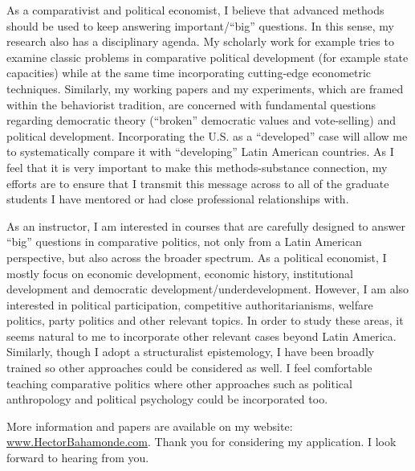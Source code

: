 \documentclass[10pt,stdletter,dateno,sigleft]{newlfm} %
\begin{document}
\begin{newlfm}
As a comparativist and political economist, I believe that advanced methods should be used to keep answering important/``big'' questions. In this sense, my research also has a disciplinary agenda. My scholarly work for example tries to examine classic problems in comparative political development (for example state capacities) while at the same time incorporating cutting-edge econometric techniques. Similarly, my working papers and my experiments, which are framed within the behaviorist tradition, are concerned with fundamental questions regarding democratic theory (``broken'' democratic values and vote-selling) and political development. Incorporating the U.S. as a ``developed'' case will allow me to systematically compare it with ``developing'' Latin American countries. As I feel that it is very important to make this methods-substance connection, my efforts are to ensure that I transmit this message across to all of the graduate students I have mentored or had close professional relationships with. 

As an instructor, I am interested in courses that are carefully designed to answer ``big'' questions in comparative politics, not only from a Latin American perspective, but also across the broader spectrum. As a political economist, I mostly focus on economic development, economic history, institutional development and democratic development/underdevelopment. However, I am also interested in political participation, competitive authoritarianisms, welfare politics, party politics and other relevant topics. In order to study these areas, it seems natural to me to incorporate other relevant cases beyond Latin America. Similarly, though I adopt a structuralist epistemology, I have been broadly trained so other approaches could be considered as well. I feel comfortable teaching comparative politics where other approaches such as political anthropology and political psychology could be incorporated too.


More information and papers are available on my website: \href{http://www.hectorbahamonde.com}{www.HectorBahamonde.com}. Thank you for considering my application. I look forward to hearing from you.






\end{newlfm}
\end{document}
